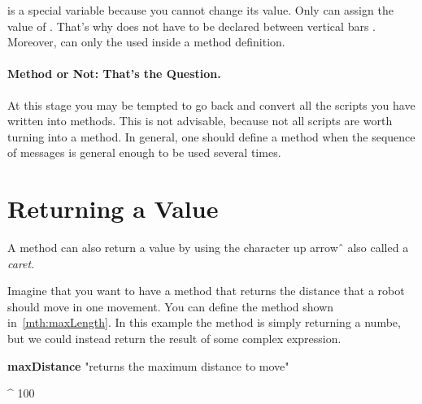 
\self is a special variable because you cannot change its value. Only \sq can assign the value of \self. That's why \self does not have to be declared between vertical bars \ct{|}. Moreover, \self can only the used inside a method definition.



\paragraph{Method or Not: That's the Question.} At this stage you may be tempted to go back and convert all the scripts you have written into methods. This is not advisable, because not all scripts are worth turning into a method. In general, one should define a method when the sequence of messages is general enough to be used several times.


\section{Returning a Value}
A method can also return a value by using the character up arrow \^\, also called     a \emph{caret}.

Imagine that you want to have a method that returns the distance that a robot should move in one movement. You can define the method  shown in~\ref{mth:maxLength}. In this example the method is simply returning a numbe, but we could instead return the result of some complex expression. 

\begin{method}\label{mth:maxLength}
\textbf{maxDistance}
   "returns the maximum distance to move"

   ^ 100
\end{method}

